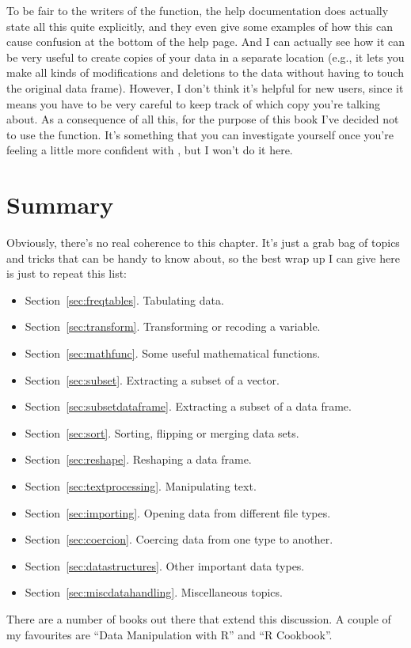 To be fair to the writers of the  function, the help documentation does actually state all this quite explicitly, and they even give some examples of how this can cause confusion at the bottom of the help page. And I can actually see how it can be very useful to create copies of your data in a separate location (e.g., it lets you make all kinds of modifications and deletions to the data without having to touch the original data frame). However, I don't think it's helpful for new users, since it means you have to be very careful to keep track of which copy you're talking about. As a consequence of all this, for the purpose of this book I've decided not to use the  function. It's something that you can investigate yourself once you're feeling a little more confident with \R, but I won't do it here. 




\section{Summary}

Obviously, there's no real coherence to this chapter. It's just a grab bag of topics and tricks that can be handy to know about, so the best wrap up I can give here is just to repeat this list:

\begin{itemize} \itemsep 0pt
\item Section~\ref{sec:freqtables}. Tabulating data.
\item Section~\ref{sec:transform}. Transforming or recoding a variable.
\item Section~\ref{sec:mathfunc}. Some useful mathematical functions.
\item Section~\ref{sec:subset}. Extracting a subset of a vector.
\item Section~\ref{sec:subsetdataframe}. Extracting a subset of a data frame.
\item Section~\ref{sec:sort}. Sorting, flipping or merging data sets.
\item Section~\ref{sec:reshape}. Reshaping a data frame.
\item Section~\ref{sec:textprocessing}. Manipulating text.
\item Section~\ref{sec:importing}. Opening data from different file types.
\item Section~\ref{sec:coercion}. Coercing data from one type to another.
\item Section~\ref{sec:datastructures}. Other important data types.
\item Section~\ref{sec:miscdatahandling}. Miscellaneous topics.
\end{itemize}

There are a number of books out there that extend this discussion. A couple of my favourites are  ``Data Manipulation with R'' and  ``R Cookbook''. 







